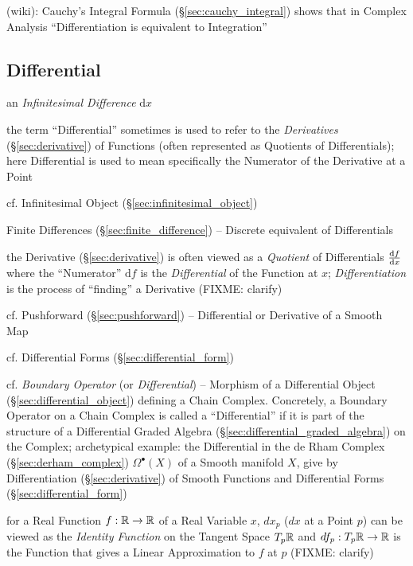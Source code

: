 {(wiki): Cauchy's Integral Formula (\S\ref{sec:cauchy_integral}) shows that in
Complex Analysis ``Differentiation is equivalent to Integration''



\subsection{Differential}\label{sec:differential}

an \emph{Infinitesimal Difference} $\mathrm{d}x$

the term ``Differential'' sometimes is used to refer to the \emph{Derivatives}
(\S\ref{sec:derivative}) of Functions (often represented as Quotients of
Differentials); here Differential is used to mean specifically the Numerator of
the Derivative at a Point

\fist cf. Infinitesimal Object (\S\ref{sec:infinitesimal_object})

\fist Finite Differences (\S\ref{sec:finite_difference}) -- Discrete equivalent
of Differentials

\fist the Derivative (\S\ref{sec:derivative}) is often viewed as a
\emph{Quotient} of Differentials $\frac{\mathrm{d}f}{\mathrm{d}x}$ where the ``Numerator''
$\mathrm{d}f$ is the \emph{Differential} of the Function at $x$;
\emph{Differentiation} is the process of ``finding'' a Derivative (FIXME:
clarify)

\fist cf. Pushforward (\S\ref{sec:pushforward}) -- Differential or Derivative of
a Smooth Map

\fist cf. Differential Forms (\S\ref{sec:differential_form})

\fist cf. \emph{Boundary Operator} (or \emph{Differential}) -- Morphism of a
Differential Object (\S\ref{sec:differential_object}) defining a Chain Complex.
Concretely, a Boundary Operator on a Chain Complex is called a ``Differential''
if it is part of the structure of a Differential Graded Algebra
(\S\ref{sec:differential_graded_algebra}) on the Complex; archetypical example:
the Differential in the de Rham Complex (\S\ref{sec:derham_complex})
$\Omega^\bullet(X)$ of a Smooth manifold $X$, give by Differentiation
(\S\ref{sec:derivative}) of Smooth Functions and Differential Forms
(\S\ref{sec:differential_form})

for a Real Function $f : \mathbb{R} \rightarrow \mathbb{R}$ of a Real Variable $x$,
$dx_p$ ($dx$ at a Point $p$) can be viewed as the \emph{Identity Function} on
the Tangent Space $T_p\mathbb{R}$ and $df_p : T_p\mathbb{R} \rightarrow \mathbb{R}$ is the
Function that gives a Linear Approximation to $f$ at $p$ (FIXME: clarify)

}
